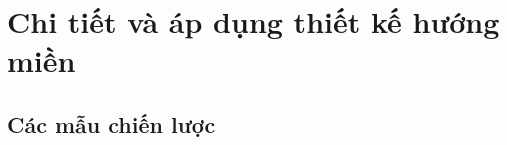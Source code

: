 \documentclass{report} %
\begin{document}

% 


% 

% 


% 


\chapter{Chi tiết và áp dụng thiết kế hướng miền}



% 




 



% 






\section{Các mẫu chiến lược}


% 

\end{document}
